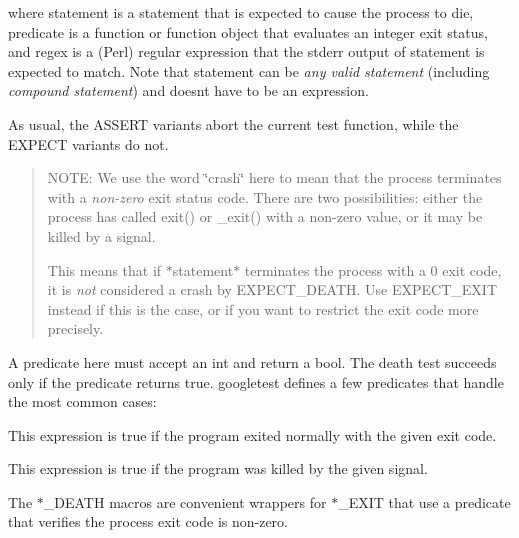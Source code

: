 where {\ttfamily statement} is a statement that is expected to cause the process to die, {\ttfamily predicate} is a function or function object that evaluates an integer exit status, and {\ttfamily regex} is a (Perl) regular expression that the stderr output of {\ttfamily statement} is expected to match. Note that {\ttfamily statement} can be {\itshape any valid statement} (including {\itshape compound statement}) and doesn\textquotesingle{}t have to be an expression.

As usual, the {\ttfamily A\+S\+S\+E\+RT} variants abort the current test function, while the {\ttfamily E\+X\+P\+E\+CT} variants do not.

\begin{quote}
N\+O\+TE\+: We use the word \char`\"{}crash\char`\"{} here to mean that the process terminates with a {\itshape non-\/zero} exit status code. There are two possibilities\+: either the process has called {\ttfamily exit()} or {\ttfamily \+\_\+exit()} with a non-\/zero value, or it may be killed by a signal.

This means that if {\ttfamily $\ast$statement$\ast$} terminates the process with a 0 exit code, it is {\itshape not} considered a crash by {\ttfamily E\+X\+P\+E\+C\+T\+\_\+\+D\+E\+A\+TH}. Use {\ttfamily E\+X\+P\+E\+C\+T\+\_\+\+E\+X\+IT} instead if this is the case, or if you want to restrict the exit code more precisely. \end{quote}


A predicate here must accept an {\ttfamily int} and return a {\ttfamily bool}. The death test succeeds only if the predicate returns {\ttfamily true}. googletest defines a few predicates that handle the most common cases\+:


\begin{DoxyCode}{0}
\end{DoxyCode}


This expression is {\ttfamily true} if the program exited normally with the given exit code.


\begin{DoxyCode}{0}
\end{DoxyCode}


This expression is {\ttfamily true} if the program was killed by the given signal.

The {\ttfamily $\ast$\+\_\+\+D\+E\+A\+TH} macros are convenient wrappers for {\ttfamily $\ast$\+\_\+\+E\+X\+IT} that use a predicate that verifies the process\textquotesingle{} exit code is non-\/zero.

